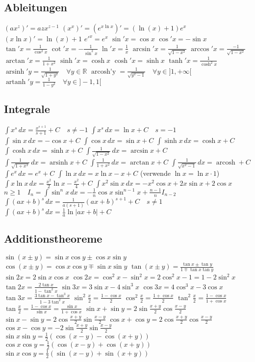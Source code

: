 \documentclass[landscape, 10pt]{article}
\newcommand{\R}{\mathbb{R}}
\begin{document}
\begin{multicols}{3}
\subsection{Ableitungen}
$(ax^z)'=azx^{z-1}$
$(x^x)'=(e^{x\ln x})'=(\ln(x)+1)e^x$
$(x\ln x)'=\ln(x)+1$
$e'^x=e^x$ 
$\sin'x=\cos x$
$\cos'x=-\sin x$
$\tan'x=\frac{1}{\cos^2x}$
$\cot'x=-\frac{1}{\sin^2x}$
$\ln'x=\frac{1}{x}$
$\arcsin'x=\frac{1}{\sqrt{1-x^2}}$
$\arccos'x=\frac{-1}{\sqrt{1-x^2}}$
$\arctan'x=\frac{1}{1+x^2}$
$\sinh'x=\cosh x$
$\cosh'x=\sinh x$
$\tanh'x=\frac{1}{\cosh^2x}$ 
$\operatorname{arsinh}'y
        =\frac{1}{\sqrt{1+y^2}}\quad\forall y\in\R$
$\operatorname{arcosh'y}
        =\frac{1}{\sqrt{y^2-1}}\quad\forall y\in]1,+\infty[$
$\operatorname{artanh}'y=\frac{1}{1-y^2}\quad\forall y\in]-1,1[$


\subsection{Integrale}
$\int x^s\,dx=\frac{x^{s+1}}{s+1}+C\quad s\neq-1$\qquad
                $\int x^s\,dx=\ln x+C\quad s=-1$ 
$\int\sin x\,dx=-\cos x+C$ 
$\int\cos x\,dx=\sin x+C$
$\int\sinh x\,dx=\cosh x+C$
$\int\cosh x\,dx=\sinh x+C$
$\int\frac{1}{\sqrt{1-x^2}}\,dx=\arcsin x+C$
$\int\frac{1}{\sqrt{1+x^2}}\,dx=\operatorname{arsinh} x+C$
$\int\frac{1}{1+x^2}\,dx=\arctan x+C$
$\int\frac{1}{\sqrt{x^2-1}}\,dx=\operatorname{arcosh}+C$
$\int e^x\,dx=e^x+C$
$\int\ln x\,dx=x\ln x-x+C$ (verwende $\ln x=\ln x\cdot1$)
$\int x\ln x\,dx=\frac{x^2}{2}\ln x-\frac{x^2}{4}+C$
$\int x^2\sin x\,dx=-x^2\cos x+2x\sin x+2\cos x$ 
$n\geqslant1\quad I_n=\int\sin^nx\,dx=-\frac{1}{n}\cos x\sin^{n-1}x
                +\frac{n-1}{n}I_{n-2}$
$\int(ax+b)^s\,dx=\frac{1}{a(s+1)}(ax+b)^{s+1}+C\quad s\neq1$\qquad
                $\int(ax+b)^s\,dx=\frac{1}{a}\ln|ax+b|+C$





\subsection{Additionstheoreme}
$\sin(x\pm y)=\sin x\cos y\pm\cos x\sin y$
$\cos(x\pm y)=\cos x\cos y\mp\sin x\sin y$
$\tan(x\pm y)=\frac{\tan x\pm\tan y}{1\mp\tan x\tan y}$
$\sin 2x=2\sin x\cos x$
$\cos 2x=\cos^2x-\sin^2x=2\cos^2x-1=1-2\sin^2x$
$\tan 2x=\frac{2\tan x}{1-\tan^2x}$
$\sin 3x=3\sin x-4\sin^3x$
$\cos 3x=4\cos^3x-3\cos x$
$\tan 3x=\frac{3\tan x-\tan^3x}{1-3\tan^2 x}$
$\sin^2\frac{x}{2}=\frac{1-\cos x}{2}$
$\cos^2\frac{x}{2}=\frac{1+\cos x}{2}$
$\tan^2\frac{x}{2}=\frac{1-\cos x}{1+\cos x}$
$\tan\frac{x}{2}=\frac{1-\cos x}{\sin x}=\frac{\sin x}{1+\cos x}$
$\sin x+\sin y=2\sin\frac{x+y}{2}\cos\frac{x-y}{2}$
$\sin x-\sin y=2\cos\frac{x+y}{2}\sin\frac{x-y}{2}$
$\cos x+\cos y=2\cos\frac{x+y}{2}\cos\frac{x-y}{2}$
$\cos x-\cos y=-2\sin\frac{x+y}{2}\sin\frac{x-y}{2}$
$\sin x\sin y=\frac{1}{2}(\cos(x-y)-\cos(x+y))$
$\cos x\cos y=\frac{1}{2}(\cos(x-y)+\cos(x+y))$
$\sin x\cos y=\frac{1}{2}(\sin(x-y)+\sin(x+y))$


\end{multicols}
\end{document}
